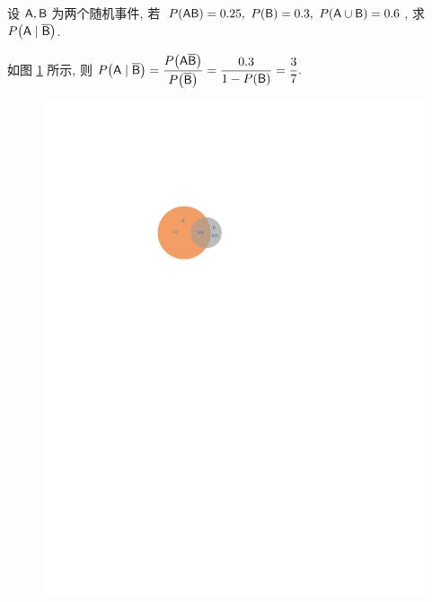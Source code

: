 \begin{example}
    设 $\mathsf{A},\mathsf{B}$ 为两个随机事件, 若 $P(\mathsf{AB})=0.25,~P(\mathsf{B})=0.3,~P(\mathsf{A}\cup\mathsf{B})=0.6$, 求 $P\qty(\mathsf{A}\mid\overline{\mathsf{B}})$.
\end{example}
\begin{solution}
    如图 \ref{figures/ven1.pdf} 所示, 则 $P\qty(\mathsf{A}\mid\overline{\mathsf{B}})=\dfrac{P\qty(\mathsf{A\overline{B}})}{P\qty(\overline{\mathsf{B}})}=\dfrac{0.3}{1-P(\mathsf{B})}=\dfrac{3}{7}.$
\end{solution}

\begin{minipage}[b]{0.3\linewidth}
    \begin{figure}[H]
        \centering
        \includegraphics[scale=0.8]{figures/ven1.pdf}
        \caption{}
        \label{figures/ven1.pdf}
    \end{figure}
\end{minipage}\hfill
